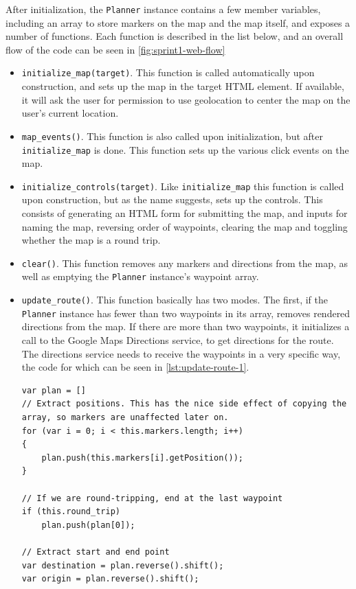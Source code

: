 After initialization, the \texttt{Planner} instance contains a few member variables, including an array to store markers on the map and the map itself, and exposes a number of functions. Each function is described in the list below, and an overall flow of the code can be seen in \autoref{fig:sprint1-web-flow}
\begin{itemize}
 \item \texttt{initialize\_map(target)}. This function is called automatically upon construction, and sets up the map in the target \ac{HTML} element. If available, it will ask the user for permission to use geolocation\cite{geolocation} to center the map on the user's current location.
 \item \texttt{map\_events()}. This function is also called upon initialization, but after \texttt{initialize\_map} is done. This function sets up the various click events on the map.
 \item \texttt{initialize\_controls(target)}. Like \texttt{initialize\_map} this function is called upon construction, but as the name suggests, sets up the controls. This consists of generating an \ac{HTML} form for submitting the map, and inputs for naming the map, reversing order of waypoints, clearing the map and toggling whether the map is a round trip.
 \item \texttt{clear()}. This function removes any markers and directions from the map, as well as emptying the \texttt{Planner} instance's waypoint array.
 \item \texttt{update\_route()}. This function basically has two modes. The first, if the \texttt{Planner} instance has fewer than two waypoints in its array, removes rendered directions from the map. If there are more than two waypoints, it initializes a call to the Google Maps Directions service, to get directions for the route. The directions service needs to receive the waypoints in a very specific way, the code for which can be seen in \autoref{lst:update-route-1}.
 \begin{lstlisting}[label={lst:update-route-1},caption={Converting a List of Waypoints for Directions}]
var plan = []
// Extract positions. This has the nice side effect of copying the array, so markers are unaffected later on.
for (var i = 0; i < this.markers.length; i++)
{
	plan.push(this.markers[i].getPosition());
}

// If we are round-tripping, end at the last waypoint
if (this.round_trip)
	plan.push(plan[0]);

// Extract start and end point
var destination = plan.reverse().shift();
var origin = plan.reverse().shift();


\end{lstlisting}
\end{itemize}
